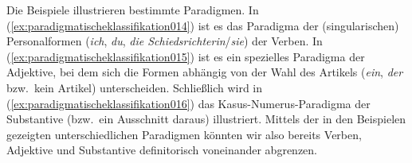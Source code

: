 \begin{exe}
  \ex \label{ex:paradigmatischeklassifikation014}
  \begin{xlist}
  \end{xlist}
  \ex \label{ex:paradigmatischeklassifikation015}
  \begin{xlist}
  \end{xlist}
  \ex \label{ex:paradigmatischeklassifikation016}
  \begin{xlist}
  \end{xlist}
\end{exe}

Die Beispiele illustrieren bestimmte Paradigmen.
In (\ref{ex:paradigmatischeklassifikation014}) ist es das Paradigma der (singularischen) Personalformen (\textit{ich}, \textit{du}, \textit{die Schiedsrichterin}/\textit{sie}) der Verben.
In (\ref{ex:paradigmatischeklassifikation015}) ist es ein spezielles Paradigma der Adjektive, bei dem sich die Formen abhängig von der Wahl des Artikels (\textit{ein}, \textit{der} bzw.\ kein Artikel) unterscheiden.
Schließlich wird in (\ref{ex:paradigmatischeklassifikation016}) das Kasus-Numerus-Paradigma der Substantive (bzw.\ ein Ausschnitt daraus) illustriert.
Mittels der in den Beispielen gezeigten unterschiedlichen Paradigmen könnten wir also bereits Verben, Adjektive und Substantive definitorisch voneinander abgrenzen.

